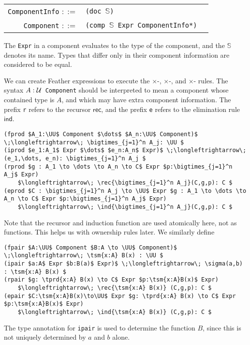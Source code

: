 \documentclass[11pt]{book}
\DeclareMathOperator*{\bigtimes}{\scalerel*{\times}{\textstyle\sum}}
\begin{document}
\begin{tabular}{r l p{7cm}}
  \lstinline!ComponentInfo! \( ::= \) & \lstinline!(doc !\( \mathbb S \)\lstinline!)! \\
  \lstinline!Component! \( ::= \) & \lstinline!(comp !\( \mathbb S \)\lstinline! Expr ComponentInfo*)!
\end{tabular}

The \lstinline{Expr} in a component evaluates to the type of the component, and the \( \mathbb S \) denotes its name.
Types that differ only in their component information are considered to be equal.

We can create Feather expressions to execute the \( \times \)-\rform, \( \times \)-\rintro, and \( \times \)-\relim{} rules.
The syntax \( A:\mathcal{U} \)\lstinline! Component! should be interpreted to mean a component whose contained type is \( A \), and which may have extra component information.
The prefix \lstinline{r} refers to the recursor \( \mathsf{rec} \), and the prefix \lstinline{e} refers to the elimination rule \( \mathsf{ind} \).
\begin{lstlisting}[mathescape=true]
(fprod $A_1:\UU$ Component $\dots$ $A_n:\UU$ Component)$ \;\longleftrightarrow\; \bigtimes_{j=1}^n A_j: \UU $
(iprod $e_1:A_1$ Expr $\dots$ $e_n:A_n$ Expr)$ \;\longleftrightarrow\; (e_1,\dots, e_n): \bigtimes_{j=1}^n A_j $
(rprod $g : A_1 \to \dots \to A_n \to C$ Expr $p:\bigtimes_{j=1}^n A_j$ Expr)
    $\longleftrightarrow\; \rec{\bigtimes_{j=1}^n A_j}(C,g,p): C $
(eprod $C : \bigtimes_{j=1}^n A_j \to \UU$ Expr $g : A_1 \to \dots \to A_n \to C$ Expr $p:\bigtimes_{j=1}^n A_j$ Expr)
    $\longleftrightarrow\; \ind{\bigtimes_{j=1}^n A_j}(C,g,p): C $
\end{lstlisting}
Note that the recursor and induction function are used atomically here, not as functions.
This helps us with ownership rules later.
We similarly define
\begin{lstlisting}[mathescape=true]
(fpair $A:\UU$ Component $B:A \to \UU$ Component)$ \;\longleftrightarrow\; \tsm{x:A} B(x) : \UU $
(ipair $a:A$ Expr $b:B(a)$ Expr)$ \;\longleftrightarrow\; \sigma(a,b) : \tsm{x:A} B(x) $
(rpair $g: \tprd{x:A} B(x) \to C$ Expr $p:\tsm{x:A}B(x)$ Expr)
    $\longleftrightarrow\; \rec{\tsm{x:A} B(x)} (C,g,p): C $
(epair $C:\tsm{x:A}B(x)\to\UU$ Expr $g: \tprd{x:A} B(x) \to C$ Expr $p:\tsm{x:A}B(x)$ Expr)
    $\longleftrightarrow\; \ind{\tsm{x:A} B(x)} (C,g,p): C $
\end{lstlisting}
The type annotation for \lstinline{ipair} is used to determine the function \( B \), since this is not uniquely determined by \( a \) and \( b \) alone.
\end{document}
